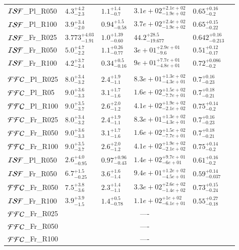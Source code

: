 \documentclass[aa]{lib/aa}
\begin{document}
\begin{table}
\begin{tabular}{llllll}
${\cal ISF}$\_Pl\_R050 & $4.3^{+4.2}_{-2.3}$ & $1.1^{+1.4}_{-0.7}$ & $3.1e+02^{+2.1e+02}_{-1.9e+02}$ & $0.65^{+0.16}_{-0.2}$ \\
${\cal ISF}$\_Pl\_R100 & $3.9^{+3.4}_{-2.0}$ & $0.94^{+1.5}_{-0.58}$ & $3.7e+02^{+2.4e+02}_{-1.9e+02}$ & $0.65^{+0.15}_{-0.22}$ \\
${\cal ISF}$\_Fr\_R025 & $3.773^{+4.03}_{-1.91}$ & $1.0^{+1.39}_{-0.60}$ & $44.2^{+28.5}_{-19.677}$ & $0.642^{+0.16}_{-0.213}$ \\
${\cal ISF}$\_Fr\_R050 & $5.0^{+4.7}_{-2.2}$ & $1.1^{+0.26}_{-0.77}$ & $3e+01^{+2.9e+01}_{-9.6}$ & $0.51^{+0.12}_{-0.17}$ \\
${\cal ISF}$\_Fr\_R100 & $4.2^{+3.7}_{-2.4}$ & $0.34^{+0.5}_{-0.16}$ & $9e+01^{+7.7e+01}_{-4.8e+01}$ & $0.72^{+0.086}_{-0.2}$ \\
  \hline \vspace{-0.75em} \\
${\cal FFC}$\_Pl\_R025 & $8.0^{+3.4}_{-3.2}$ & $2.4^{+1.9}_{-1.1}$ & $8.3e+01^{+1.3e+02}_{-4.3e+01}$ & $0.7^{+0.16}_{-0.23}$ \\
${\cal FFC}$\_Pl\_R05 &  $9.0^{+3.6}_{-3.3}$ & $3.1^{+1.7}_{-1.6}$ & $1.6e+02^{+1.5e+02}_{-7.7e+01}$ & $0.7^{+0.18}_{-0.21}$ \\ 
  ${\cal FFC}$\_Pl\_R100 &  $9.0^{+3.5}_{-3.7}$ & $2.6^{+2.0}_{-1.2}$ & $4.1e+02^{+1.9e+02}_{-2.1e+02}$ & $0.75^{+0.14}_{-0.2}$ \\
  ${\cal FFC}$\_Fr\_R025   & $8.0^{+3.4}_{-3.2}$ & $2.4^{+1.9}_{-1.1}$ & $8.3e+01^{+1.3e+02}_{-4.3e+01}$ & $0.7^{+0.16}_{-0.23}$ \\
  ${\cal FFC}$\_Fr\_R050 & $9.0^{+3.6}_{-3.3}$ & $3.1^{+1.7}_{-1.6}$ & $1.6e+02^{+1.5e+02}_{-7.7e+01}$ & $0.7^{+0.18}_{-0.21}$ \\
  ${\cal FFC}$\_Fr\_R100 & $9.0^{+3.5}_{-3.7}$ & $2.6^{+2.0}_{-1.2}$ & $4.1e+02^{+1.9e+02}_{-2.1e+02}$ & $0.75^{+0.14}_{-0.2}$ \\

\hline
${\cal ISF}$\_Pl\_R050 & $2.6^{+4.0}_{-0.95}$ & $0.97^{+0.96}_{-0.43}$ & $1.4e+02^{+9.7e+01}_{-6e+01}$ & $0.61^{+0.16}_{-0.2}$ \\
${\cal ISF}$\_Fr\_R050 &   $6.7^{+1.5}_{-0.25}$ & $3.6^{+1.6}_{-1.4}$ & $9.4e+01^{+1.2e+02}_{-4.5e+01}$ & $0.59^{+0.14}_{-0.037}$ \\ %
${\cal FFC}$\_Fr\_R050 & $7.5^{+3.8}_{-3.6}$ & $2.3^{+1.4}_{-1.1}$ & $3.3e+02^{+2.6e+02}_{-1.4e+02}$ & $0.73^{+0.15}_{-0.24}$ \\ %
${\cal ISF}$\_Fr\_R100 & $3.9^{+3.9}_{-1.5}$ & $1.4^{+0.5}_{-0.78}$ & $1.1e+02^{+1e+02}_{-6.1e+01}$ & $0.55^{+0.27}_{-0.18}$ \\
${\cal FFC}$\_Fr\_R025 & \multicolumn{4}{c}{----} \\
${\cal FFC}$\_Fr\_R050 & \multicolumn{4}{c}{----} \\
${\cal FFC}$\_Fr\_R100 & \multicolumn{4}{c}{----} \\
 \end{tabular}
\end{table}
\end{document}
